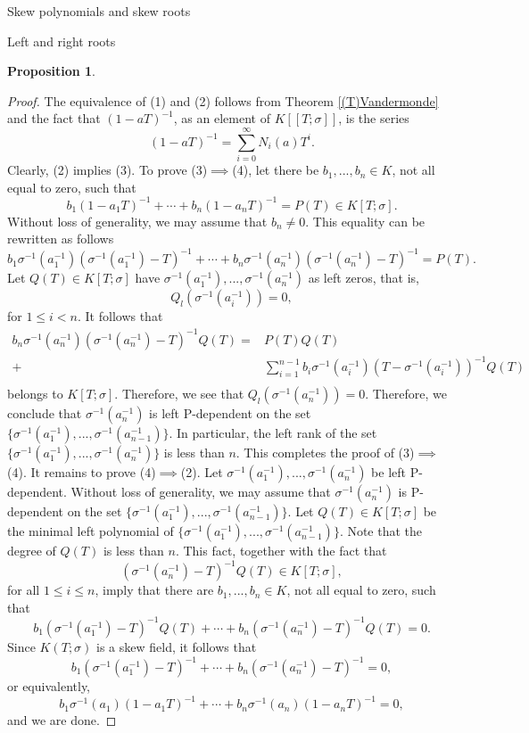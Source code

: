 \documentclass[11pt,a4paper]{article}
\theoremstyle{theorem}
\newtheorem{proposition}[theorem]{Proposition}
\numberwithin{equation}{section}
\newcommand{\s}{\sigma}
\begin{document}
\begin{section}{Skew polynomials and skew roots}
\begin{subsection}{Left and right roots}
\begin{proposition}
	\end{proposition}
	\begin{proof}
		The equivalence of (1) and (2) follows from Theorem \ref{(T)Vandermonde} and the fact that $(1-aT)^{-1}$, as an element of $K[[T;\s]]$, is the series
		$$(1-aT)^{-1}=\sum_{i=0}^\infty N_i(a)T^i.$$
		Clearly, (2) implies (3). To prove (3)$\implies$(4), let there be $b_1,...,b_n\in K$, not all equal to zero, such that
		$$b_1(1-a_1T)^{-1}+\cdots+b_n(1-a_nT)^{-1}=P(T)\in K[T;\s].$$
		Without loss of generality, we may assume that $b_n\neq 0$. This equality can be rewritten as follows
			$$b_1\s^{-1}(a_1^{-1})(\s^{-1}(a_1^{-1})-T)^{-1}+\cdots+b_n\s^{-1}(a_n^{-1})(\s^{-1}(a_n^{-1})-T)^{-1}=P(T).$$
		Let $Q(T)\in K[T;\s]$ have $\s^{-1}(a_1^{-1}),...,\s^{-1}(a_n^{-1})$ as left zeros, that is, $$Q_l(\s^{-1}(a_i^{-1}))=0,$$ for $1\leq i<n$. It follows that 
	\begin{equation*}
		\begin{aligned}
			b_n\s^{-1}(a_n^{-1})(\s^{-1}(a_n^{-1})-T)^{-1}Q(T) ={} & P(T)Q(T)\\
			+& \sum_{i=1}^{n-1}b_i\s^{-1}(a_i^{-1})(T-\s^{-1}(a_i^{-1}))^{-1}Q(T)\\
		\end{aligned}
	\end{equation*}
	belongs to $K[T;\s]$. Therefore, we see that
		 $Q_l(\s^{-1}(a_n^{-1}))=0$. Therefore, we conclude that $\s^{-1}(a_n^{-1})$ is left P-dependent on the set $\{\s^{-1}(a_1^{-1}),...,\s^{-1}(a_{n-1}^{-1})\}$. In particular, the left rank of the set $\{\s^{-1}(a_1^{-1}),...,\s^{-1}(a_n^{-1})\}$ is less than $n$. This completes the proof of  (3)$\implies$(4). It remains to prove (4)$\implies$(2). Let $\s^{-1}(a_1^{-1}),...,\s^{-1}(a_n^{-1})$ be left P-dependent. 	Without loss of generality, we may assume that $\s^{-1}(a_n^{-1})$ is P-dependent on the set $\{\s^{-1}(a_1^{-1}),...,\s^{-1}(a_{n-1}^{-1})\}$. 	Let $Q(T)\in K[T;\s]$ be the minimal left polynomial of $\{\s^{-1}(a_1^{-1}),...,\s^{-1}(a_{n-1}^{-1})\}$. Note that the degree of $Q(T)$ is less than $n$. This fact, together with the fact that 
		 $$(\s^{-1}(a_n^{-1})-T)^{-1}Q(T)\in K[T;\s],$$
		 for all $1\leq i\leq n$, imply that there are  $b_1,...,b_n\in K$, not all equal to zero, such that  $$b_1(\s^{-1}(a_1^{-1})-T)^{-1}Q(T)+\cdots+b_n(\s^{-1}(a_n^{-1})-T)^{-1}Q(T)=0.$$
		 Since $K(T;\s)$ is a skew field, it follows that 
		 $$b_1(\s^{-1}(a_1^{-1})-T)^{-1}+\cdots+b_n(\s^{-1}(a_n^{-1})-T)^{-1}=0,$$
		 or equivalently, 
		 $$b_1\s^{-1}(a_1)(1-a_1T)^{-1}+\cdots+b_n\s^{-1}(a_n)(1-a_nT)^{-1}=0,$$
		 and we are done. 

\end{proof}
\end{subsection}
\end{section}
\end{document}
